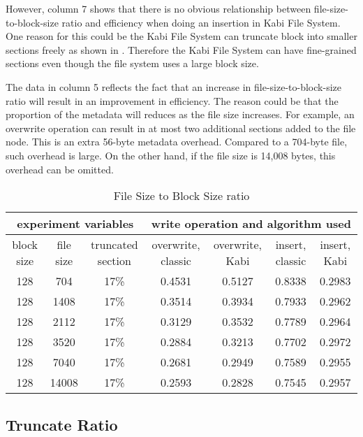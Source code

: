     However, column 7 shows that there is no obvious relationship between file-size-to-block-size ratio and efficiency when doing an insertion in Kabi File System. One reason for this could be the Kabi File System can truncate block into smaller sections freely as shown in . Therefore the Kabi File System can have fine-grained sections even though the file system uses a large block size.
    
    The data in column 5 reflects the fact that an increase in file-size-to-block-size ratio will result in an improvement in efficiency. The reason could be that the proportion of the metadata will reduces as the file size increases. For example, an overwrite operation can result in at most two additional sections added to the file node. This is an extra 56-byte metadata overhead. Compared to a 704-byte file, such overhead is large. On the other hand, if the file size is 14,008 bytes, this overhead can be omitted.

\begin{lscape} 
\begin{table}[t]
\caption{File Size to Block Size ratio}
\label{tab:fb_ratio}
\begin{center}
\begin{tabular}{|c|c|c|c|c|c|c|}
\hline
\multicolumn{3}{|c|}{experiment variables} & \multicolumn{4}{c|}{write operation and algorithm used} \\
\hline
block size & file size & truncated section & overwrite, classic & overwrite, Kabi & insert, classic & insert, Kabi\\
\hline
128 & 704 & 17\% & 0.4531 & 0.5127 & 0.8338 & 0.2983 \\
\hline
128 & 1408 & 17\% & 0.3514 & 0.3934 & 0.7933 & 0.2962 \\
\hline
128 & 2112 & 17\% & 0.3129 & 0.3532 & 0.7789 & 0.2964 \\
\hline
128 & 3520 & 17\% & 0.2884 & 0.3213 & 0.7702 & 0.2972 \\
\hline
128 & 7040 & 17\% & 0.2681 & 0.2949 & 0.7589 & 0.2955 \\
\hline
128 & 14008 & 17\% & 0.2593 & 0.2828 & 0.7545 & 0.2957 \\
\hline
\end{tabular}
\end{center}
\end{table}
\end{lscape}

\subsection{Truncate Ratio}

